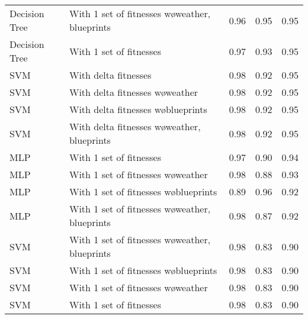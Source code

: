 \begin{tabular}{llrrr}
 Decision Tree & With 1 set of fitnesses w\o weather, blueprints &       0.96 &    0.95 & 0.95 \\
 Decision Tree &                         With 1 set of fitnesses &       0.97 &    0.93 & 0.95 \\
           SVM &                            With delta fitnesses &       0.98 &    0.92 & 0.95 \\
           SVM &                With delta fitnesses w\o weather &       0.98 &    0.92 & 0.95 \\
           SVM &             With delta fitnesses w\o blueprints &       0.98 &    0.92 & 0.95 \\
           SVM &    With delta fitnesses w\o weather, blueprints &       0.98 &    0.92 & 0.95 \\
           MLP &                         With 1 set of fitnesses &       0.97 &    0.90 & 0.94 \\
           MLP &             With 1 set of fitnesses w\o weather &       0.98 &    0.88 & 0.93 \\
           MLP &          With 1 set of fitnesses w\o blueprints &       0.89 &    0.96 & 0.92 \\
           MLP & With 1 set of fitnesses w\o weather, blueprints &       0.98 &    0.87 & 0.92 \\
           SVM & With 1 set of fitnesses w\o weather, blueprints &       0.98 &    0.83 & 0.90 \\
           SVM &          With 1 set of fitnesses w\o blueprints &       0.98 &    0.83 & 0.90 \\
           SVM &             With 1 set of fitnesses w\o weather &       0.98 &    0.83 & 0.90 \\
           SVM &                         With 1 set of fitnesses &       0.98 &    0.83 & 0.90 \\
\bottomrule
\end{tabular}
